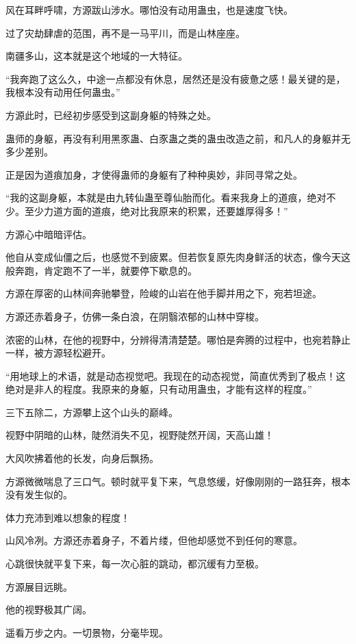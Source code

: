 
\begin{this_body}

风在耳畔呼啸，方源跋山涉水。哪怕没有动用蛊虫，也是速度飞快。

过了灾劫肆虐的范围，再不是一马平川，而是山林座座。

南疆多山，这本就是这个地域的一大特征。

“我奔跑了这么久，中途一点都没有休息，居然还是没有疲惫之感！最关键的是，我根本没有动用任何蛊虫。”

方源此时，已经初步感受到这副身躯的特殊之处。

蛊师的身躯，再没有利用黑豕蛊、白豕蛊之类的蛊虫改造之前，和凡人的身躯并无多少差别。

正是因为道痕加身，才使得蛊师的身躯有了种种奥妙，非同寻常之处。

“我的这副身躯，本就是由九转仙蛊至尊仙胎而化。看来我身上的道痕，绝对不少。至少力道方面的道痕，绝对比我原来的积累，还要雄厚得多！”

方源心中暗暗评估。

他自从变成仙僵之后，也感觉不到疲累。但若恢复原先肉身鲜活的状态，像今天这般奔跑，肯定跑不了一半，就要停下歇息的。

方源在厚密的山林间奔驰攀登，险峻的山岩在他手脚并用之下，宛若坦途。

方源还赤着身子，仿佛一条白浪，在阴翳浓郁的山林中穿梭。

浓密的山林，在他的视野中，分辨得清清楚楚。哪怕是奔腾的过程中，也宛若静止一样，被方源轻松避开。

“用地球上的术语，就是动态视觉吧。我现在的动态视觉，简直优秀到了极点！这绝对是非人的程度。我原来的身躯，只有动用蛊虫，才能有这样的程度。”

三下五除二，方源攀上这个山头的巅峰。

视野中阴暗的山林，陡然消失不见，视野陡然开阔，天高山雄！

大风吹拂着他的长发，向身后飘扬。

方源微微喘息了三口气。顿时就平复下来，气息悠缓，好像刚刚的一路狂奔，根本没有发生似的。

体力充沛到难以想象的程度！

山风冷冽。方源还赤着身子，不着片缕，但他却感觉不到任何的寒意。

心跳很快就平复下来，每一次心脏的跳动，都沉缓有力至极。

方源展目远眺。

他的视野极其广阔。

遥看万步之内。一切景物，分毫毕现。


\end{this_body}
